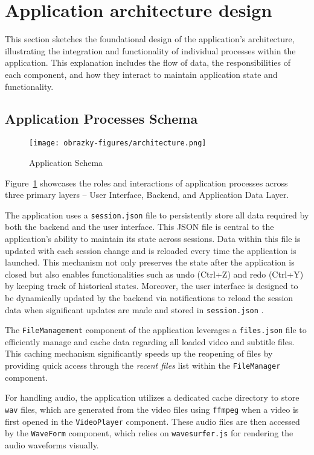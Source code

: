 \section{Application architecture design}

This section sketches the foundational design of the application's architecture, illustrating the integration and functionality of individual processes within the application. This explanation includes the flow of data, the responsibilities of each component, and how they interact to maintain application state and functionality.

\subsection{Application Processes Schema}

\begin{figure}[ht]
\centering
\texttt{[image: obrazky-figures/architecture.png]}
\caption{Application Schema}
\label{fig:design:architecture}
\end{figure}

Figure~\ref{fig:design:architecture} showcases the roles and interactions of application processes across three primary layers -- User Interface, Backend, and Application Data Layer.

The application uses a \texttt{session.json} file to persistently store all data required by both the backend and the user interface. This JSON file is central to the application’s ability to maintain its state across sessions. Data within this file is updated with each session change and is reloaded every time the application is launched. This mechanism not only preserves the state after the application is closed but also enables functionalities such as undo (Ctrl+Z) and redo (Ctrl+Y) by keeping track of historical states. Moreover, the user interface is designed to be dynamically updated by the backend via notifications to reload the session data when significant updates are made and stored in \texttt{session.json} .

The \texttt{FileManagement} component of the application leverages a \texttt{files.json} file to efficiently manage and cache data regarding all loaded video and subtitle files. This caching mechanism significantly speeds up the reopening of files by providing quick access through the \textit{recent files} list within the \texttt{FileManager} component. 

For handling audio, the application utilizes a dedicated cache directory to store \texttt{wav} files, which are generated from the video files using \texttt{ffmpeg} when a video is first opened in the \texttt{VideoPlayer} component. These audio files are then accessed by the \texttt{WaveForm} component, which relies on \texttt{wavesurfer.js} for rendering the audio waveforms visually.

